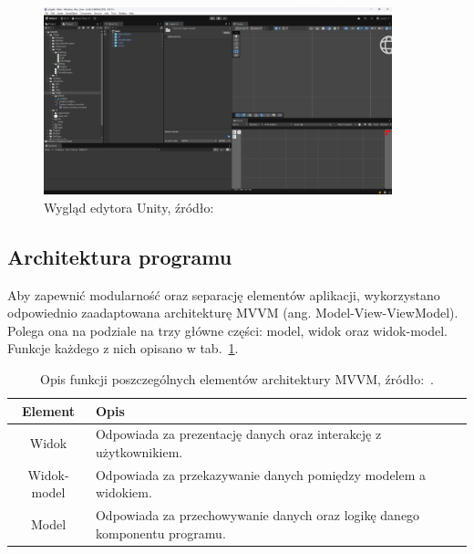 \begin{figure}[h]
    \centering
    \includegraphics[width=0.9\textwidth]{chapters/chapter3/rys/unity_editor}
    \caption[Widok okna edytora Unity]{Wygląd edytora Unity, źródło: \cite{unity_site}}
    \label{fig:unity_editor}
\end{figure}



\subsection{Architektura programu}
\label{subsec:architektura_programu}

Aby zapewnić modularność oraz separację elementów aplikacji,
wykorzystano odpowiednio zaadaptowana architekturę MVVM (ang. Model-View-ViewModel).
Polega ona na podziale na trzy główne części: model, widok oraz widok-model.
Funkcje każdego z nich opisano w tab.~\ref{tab:mvvm}.

\begin{table}[h]
    \centering
    \caption[Opis funkcji poszczególnych elementów architektury MVVM.]
    {Opis funkcji poszczególnych elementów architektury MVVM, źródło:~\cite{mvvm}.}
    \label{tab:mvvm}
    \begin{tabular}{|c|p{}|}
        \hline
        Element & Opis \\
        \hline
        \hline
        Widok & Odpowiada za prezentację danych oraz interakcję z użytkownikiem. \\
        \hline
        Widok-model & Odpowiada za przekazywanie danych pomiędzy modelem a widokiem. \\
        \hline
        Model & Odpowiada za przechowywanie danych oraz logikę danego komponentu programu. \\
        \hline
    \end{tabular}
\end{table}

